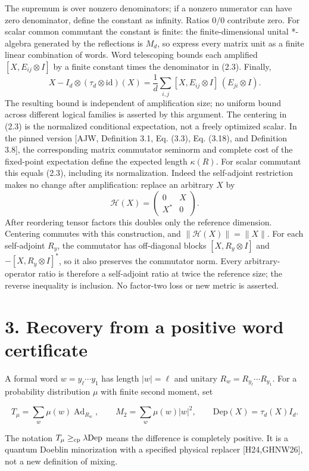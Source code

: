 \documentclass[11pt]{article}
\begin{document}
The supremum is over nonzero denominators; if a nonzero numerator can have
zero denominator, define the constant as infinity. Ratios \(0/0\) contribute
zero. For scalar common commutant the constant is finite: the finite-dimensional
unital *-algebra generated by the reflections is \(M_d\), so express every
matrix unit as a finite linear combination of words. Word telescoping bounds
each amplified \([X,E_{ij}\otimes I]\) by a finite constant times the
denominator in (2.3). Finally,
\[
X-I_d\otimes(\tau_d\otimes\mathrm{id})(X)
=\frac1d\sum_{i,j}[X,E_{ij}\otimes I]\,(E_{ji}\otimes I).
\]
The resulting bound is independent of amplification size; no uniform bound
across different logical families is asserted by this argument.
The centering in (2.3) is the
normalized conditional expectation, not a freely optimized scalar. In the
pinned version [AJW, Definition 3.1, Eq. (3.3), Eq. (3.18), and Definition 3.8],
the corresponding matrix commutator seminorm and complete cost of the
fixed-point expectation define the expected length \(\kappa(R)\).
For scalar commutant this equals (2.3), including its normalization.
Indeed the self-adjoint restriction makes no change after amplification:
replace an arbitrary \(X\) by
\[
\mathcal H(X)=\begin{pmatrix}0&X\\X^*&0\end{pmatrix}.
\]
After reordering tensor factors this doubles only the reference dimension.
Centering commutes with this construction, and
\(\|\mathcal H(X)\|=\|X\|\). For each self-adjoint \(R_y\), the
commutator has off-diagonal blocks \([X,R_y\otimes I]\) and
\(-[X,R_y\otimes I]^*\), so it also preserves the commutator norm.
Every arbitrary-operator ratio is therefore a self-adjoint ratio at twice
the reference size; the reverse inequality is inclusion. No factor-two loss
or new metric is asserted.

\section*{3. Recovery from a positive word certificate}

A formal word \(w=y_\ell\cdots y_1\) has length \(|w|=\ell\) and unitary
\(R_w=R_{y_\ell}\cdots R_{y_1}\). For a probability distribution \(\mu\)
with finite second moment, set

\[
T_\mu=\sum_w\mu(w)\operatorname{Ad}_{R_w},\qquad
M_2=\sum_w\mu(w)|w|^2,\qquad
\mathrm{Dep}(X)=\tau_d(X)I_d.
\]

The notation \(T_\mu\ge_{\rm cp}\lambda\mathrm{Dep}\) means the difference
is completely positive. It is a quantum Doeblin minorization with a specified
physical replacer [H24,GHNW26], not a new definition of mixing.
\end{document}
